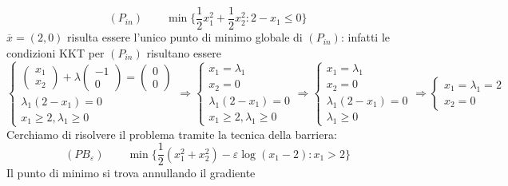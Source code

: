 \begin{example}
$$
(P_{in}) \qquad
\min\{ \dfrac{1}{2} x_1^{2} +
\dfrac{1}{2} x_2^{2}  : 2 -x_1 \leq 0  \}  $$
$\overline{x}=(2,0)$ risulta essere l'unico punto di minimo
globale di $(P_{in})$: infatti le condizioni
KKT per $(P_{in})$ risultano essere
$$
 \left\{
\begin{array}{l}
\begin{pmatrix}
  x_1 \\
 x_2
\end{pmatrix}
+ \lambda
\begin{pmatrix}
  -1 \\
 0
\end{pmatrix}
=
\begin{pmatrix}
 0 \\
 0
\end{pmatrix} \\
\lambda_1(2 - x_1) = 0 \\
 x_1 \geq 2, \lambda_1 \geq 0 
\end{array}
\right.
\Rightarrow
\left\{
  \begin{array}{l}
    x_1 = \lambda_1 \\
    x_2 = 0 \\
   \lambda_1(2-x_1) = 0 \\
   x_1 \geq 2, \lambda_1 \geq 0
  \end{array}
\right.
\Rightarrow
\left\{
  \begin{array}{l}
    x_1 = \lambda_1 \\
    x_2 = 0 \\
   \lambda_1(2-x_1) = 0 \\
    \lambda_1 \geq 0
  \end{array}
\right.
\Rightarrow
\left\{
  \begin{array}{l}
    x_1 = \lambda_1  = 2\\
    x_2 = 0 
  \end{array}
\right.
$$
Cerchiamo di risolvere il problema tramite la tecnica
della barriera:
$$ (PB_{\varepsilon}) \qquad 
\min \{ \dfrac{1}{2}(x_1^{2} + x_2^{2}) - \varepsilon \log(x_1 -2) :
 x_1 > 2 \}
$$
Il punto di minimo si trova annullando il gradiente


\end{example}
